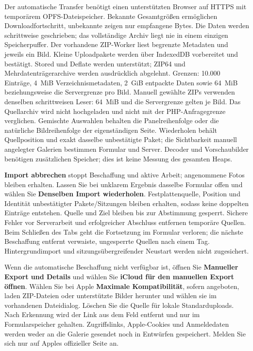 \documentclass[11pt,a4paper]{article}
\newcommand{\ui}[1]{\textbf{#1}}
\begin{document}
Der automatische Transfer benötigt einen unterstützten Browser auf HTTPS mit
temporärem OPFS-Dateispeicher. Bekannte Gesamtgrößen ermöglichen
Downloadfortschritt, unbekannte zeigen nur empfangene Bytes. Die Daten werden
schrittweise geschrieben; das vollständige Archiv liegt nie in einem einzigen
Speicherpuffer. Der vorhandene ZIP-Worker liest begrenzte Metadaten und jeweils
ein Bild. Kleine Uploadpakete werden über IndexedDB vorbereitet und bestätigt.
Stored und Deflate werden unterstützt; ZIP64 und Mehrdatenträgerarchive werden
ausdrücklich abgelehnt. Grenzen: 10.000 Einträge, 4~MiB Verzeichnismetadaten,
2~GiB entpackte Daten sowie 64~MiB beziehungsweise die Servergrenze pro Bild.
Manuell gewählte ZIPs verwenden denselben schrittweisen Leser: 64~MiB und die
Servergrenze gelten je Bild. Das Quellarchiv wird nicht hochgeladen und nicht
mit der PHP-Anfragegrenze verglichen. Gemischte Auswahlen behalten die
Panelreihenfolge oder die natürliche Bildreihenfolge der eigenständigen Seite.
Wiederholen behält Quellposition und exakt dasselbe unbestätigte Paket; die
Sichtbarkeit manuell angelegter Galerien bestimmen Formular und Server. Decoder
und Vorschaubilder benötigen zusätzlichen Speicher; dies ist keine Messung des
gesamten Heaps.

\ui{Import abbrechen} stoppt Beschaffung und aktive Arbeit; angenommene Fotos
bleiben erhalten. Lassen Sie bei unklarem Ergebnis dasselbe Formular offen und
wählen Sie \ui{Denselben Import wiederholen}. Festplattenquelle, Position und
Identität unbestätigter Pakete/Sitzungen bleiben erhalten, sodass keine
doppelten Einträge entstehen. Quelle und Ziel bleiben bis zur Abstimmung
gesperrt. Sichere Fehler vor Serverarbeit und erfolgreicher Abschluss entfernen
temporäre Quellen. Beim Schließen des Tabs geht die Fortsetzung im Formular
verloren; die nächste Beschaffung entfernt verwaiste, ungesperrte Quellen nach
einem Tag. Hintergrundimport und sitzungsübergreifender Neustart werden nicht
zugesichert.

Wenn die automatische Beschaffung nicht verfügbar ist, öffnen Sie \ui{Manueller
Export und Details} und wählen Sie \ui{iCloud für den manuellen Export öffnen}.
Wählen Sie bei Apple \ui{Maximale Kompatibilität}, sofern angeboten, laden
ZIP-Dateien oder unterstützte Bilder herunter und wählen sie im vorhandenen
Dateidialog. Löschen Sie die Quelle für lokale Standarduploads. Nach Erkennung
wird der Link aus dem Feld entfernt und nur im Formularspeicher gehalten.
Zugriffslinks, Apple-Cookies und Anmeldedaten werden weder an die Galerie
gesendet noch in Entwürfen gespeichert. Melden Sie sich nur auf Apples
offizieller Seite an.
\end{document}
